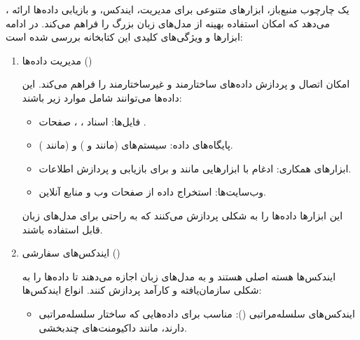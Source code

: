 \documentclass[11pt, a4paper, oneside]{book}
\begin{document}
				، یک چارچوب منبع‌باز، ابزارهای متنوعی برای مدیریت، ایندکس، و بازیابی داده‌ها ارائه می‌دهد که امکان استفاده بهینه از مدل‌های زبان بزرگ را فراهم می‌کند. در ادامه ابزارها و ویژگی‌های کلیدی این کتابخانه بررسی شده است:
				
				\begin{enumerate}
					
					\item {\large مدیریت داده‌ها ()} \par
					
					امکان اتصال و پردازش داده‌های ساختارمند و غیرساختارمند را فراهم می‌کند. این داده‌ها می‌توانند شامل موارد زیر باشند:
					
					\begin{itemize}
						
						\item {\large فایل‌ها}:
						اسناد ، ، صفحات .
						
						\item {\large پایگاه‌های داده}:
						سیستم‌های  (مانند  و ) و  (مانند ).
						
						\item {\large ابزارهای همکاری}:
						ادغام با ابزارهایی مانند  و  برای بازیابی و پردازش اطلاعات.
						
						\item {\large وب‌سایت‌ها}:
						استخراج داده از صفحات وب و منابع آنلاین.
						
					\end{itemize}
					
					این ابزارها داده‌ها را به شکلی پردازش می‌کنند که به راحتی برای مدل‌های زبان قابل استفاده باشند.
					
					
					\item {\large ایندکس‌های سفارشی ()} \par
					
					ایندکس‌ها هسته اصلی  هستند و به مدل‌های زبان اجازه می‌دهند تا داده‌ها را به شکلی سازمان‌یافته و کارآمد پردازش کنند. انواع ایندکس‌ها:
					
					\begin{itemize}
						
						\item {\large ایندکس‌های سلسله‌مراتبی ()}:
						مناسب برای داده‌هایی که ساختار سلسله‌مراتبی دارند، مانند داکیومنت‌های چندبخشی. 
						

\end{itemize}
\end{enumerate}
\end{document}
